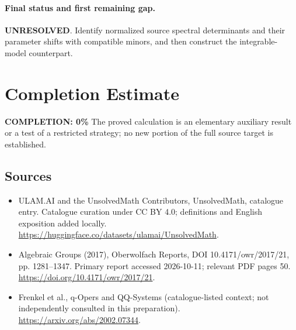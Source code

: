\documentclass[11pt]{article}
\begin{document}
\paragraph{Final status and first remaining gap.}
\textbf{UNRESOLVED}. Identify normalized source spectral determinants and their parameter shifts with compatible minors, and then construct the integrable-model counterpart.

\section{Completion Estimate}
\noindent\textbf{COMPLETION: 0\%}
The proved calculation is an elementary auxiliary result or a test of a restricted strategy; no new portion of the full source target is established.

\subsection{Sources}
\begin{itemize}
\item[\hypertarget{source:statement:1}{S1}] ULAM.AI and the UnsolvedMath Contributors, UnsolvedMath, catalogue entry. Catalogue curation under CC BY 4.0; definitions and English exposition added locally.
\url{https://huggingface.co/datasets/ulamai/UnsolvedMath}.
\item[\hypertarget{source:statement:2}{S2}] Algebraic Groups (2017), Oberwolfach Reports, DOI 10.4171/owr/2017/21, pp. 1281--1347. Primary report accessed 2026-10-11; relevant PDF pages 50.
\url{https://doi.org/10.4171/owr/2017/21}.
\item[\hypertarget{source:statement:3}{S3}] Frenkel et al., q-Opers and QQ-Systems (catalogue-listed context; not independently consulted in this preparation).
\url{https://arxiv.org/abs/2002.07344}.
\end{itemize}
\label{end:statement}
\end{document}
